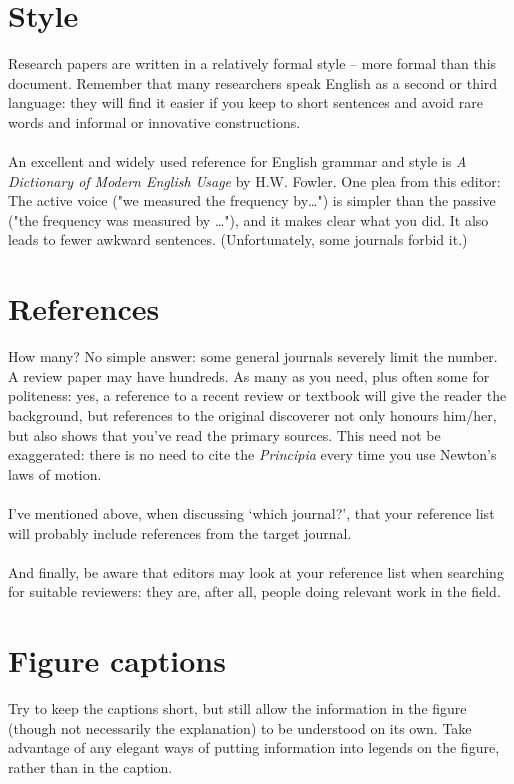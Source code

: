 \documentclass[a4paper,12pt]{article}
\begin{document}
\section{Style}
Research papers are written in a relatively formal style – more formal than this document. Remember that many researchers speak English as a second or third language: they will find it easier if you keep to short sentences and avoid rare words and informal or innovative constructions.\\\\An excellent and widely used reference for English grammar and style is \textit{A Dictionary of Modern English Usage} by H.W. Fowler. One plea from this editor: The active voice ("we measured the frequency by…") is simpler than the passive ("the frequency was measured by …"), and it makes clear what you did. It also leads to fewer awkward sentences. (Unfortunately, some journals forbid it.)
\section{References}
How many? No simple answer: some general journals severely limit the number. A review paper may have hundreds. As many as you need, plus often some for politeness: yes, a reference to a recent review or textbook will give the reader the background, but references to the original discoverer not only honours him/her, but also shows that you’ve read the primary sources. This need not be exaggerated: there is no need to cite the \textit{Principia} every time you use Newton's laws of motion.\\\\I’ve mentioned above, when discussing ‘which journal?’, that your reference list will probably include references from the target journal.\\\\And finally, be aware that editors may look at your reference list when searching for suitable reviewers: they are, after all, people doing relevant work in the field.
\section{Figure captions}
Try to keep the captions short, but still allow the information in the figure (though not necessarily the explanation) to be understood on its own. Take advantage of any elegant ways of putting information into legends on the figure, rather than in the caption. 
\end{document}
